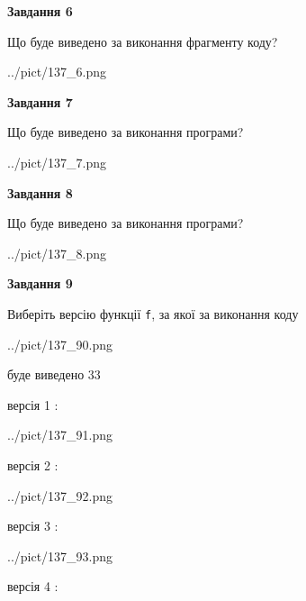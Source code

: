 \documentclass[12pt, ukrainian]{article}
\def\code#1{\Verb!#1!}
\begin{document}
{\begin {large}
{\begin {center}\textbf{Завдання 6}\end {center}}

Що буде виведено за виконання фрагменту коду?\par
\begin{center}
	{../pict/137_6.png}
\end{center}
\newpage

{\begin {center}\textbf{Завдання 7}\end {center}}

Що буде виведено за виконання програми?\par
\begin{center}
	{../pict/137_7.png}
\end{center}
\newpage

{\begin {center}\textbf{Завдання 8}\end {center}}

Що буде виведено за виконання програми?\par
\begin{center}
	{../pict/137_8.png}
\end{center}
\newpage

{\begin {center}\textbf{Завдання 9}\end {center}}

Виберіть версію функції \code{f}, за якої за виконання коду
\begin{center}
	{../pict/137_90.png}
\end{center}
буде виведено 33

\vspace{5mm}
версія 1 :

\begin{center}
	{../pict/137_91.png}
\end{center}
версія 2 :

\begin{center}
	{../pict/137_92.png}
\end{center}
версія 3 :

\begin{center}
	{../pict/137_93.png}
\end{center}
версія 4 :


\end{large}}
\end{document}
